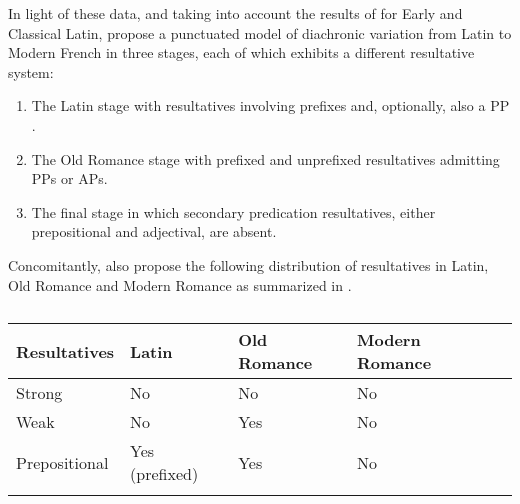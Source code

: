 \documentclass[output=paper,colorlinks,citecolor=brown,
]{langscibook}
\begin{document}



In light of these data, and taking into account the results of \citet{Acedo-Matellan2010} for Early and Classical Latin, \citet{trobergburnett} propose a punctuated model of diachronic variation from Latin to Modern French in three stages, each of which exhibits a different resultative system:

 

\begin{enumerate}
	\item The Latin stage with resultatives involving prefixes and, optionally, also a PP \citep{Talmy2000}.

	\item The Old Romance stage with prefixed and unprefixed resultatives admitting PPs or APs.

	\item The final stage in which secondary predication resultatives, either prepositional and adjectival, are absent.
\end{enumerate}\par

\noindent Concomitantly, \citet{trobergburnett} also propose the following distribution of resultatives in Latin, Old Romance and Modern Romance as summarized in .


\begin{table}
\caption{\citet{trobergburnett}}
\label{tab:acedomatellan:1:frequencies}
 \begin{tabular}{l llll}
  \lsptoprule
Resultatives & Latin & Old Romance & Modern Romance\\
  \midrule
  Strong  &   No  &    No  &    No      \\
  Weak  &   No &   Yes  &    No     \\
  Prepositional & Yes (prefixed) & Yes & No\\
  \lspbottomrule
 \end{tabular}
\end{table}
\end{document}
